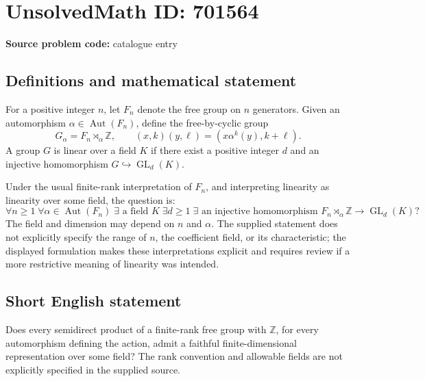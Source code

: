 \documentclass[11pt]{article}
\begin{document}
\section*{UnsolvedMath ID: 701564}
\textbf{Source problem code:} catalogue entry
\subsection{Definitions and mathematical statement}
For a positive integer \(n\), let \(F_n\) denote the free group on \(n\) generators. Given an automorphism \(\alpha\in\operatorname{Aut}(F_n)\), define the free-by-cyclic group
\[
G_\alpha=F_n\rtimes_\alpha\mathbb Z,
\qquad
(x,k)(y,\ell)=(x\alpha^k(y),k+\ell).
\]
A group \(G\) is linear over a field \(K\) if there exist a positive integer \(d\) and an injective homomorphism \(G\hookrightarrow\operatorname{GL}_d(K)\).

Under the usual finite-rank interpretation of \(F_n\), and interpreting linearity as linearity over some field, the question is:
\[
\forall n\geq 1\;\forall\alpha\in\operatorname{Aut}(F_n)\;
\exists\text{ a field }K\;\exists d\geq 1\;\exists\text{ an injective homomorphism }
F_n\rtimes_\alpha\mathbb Z\longrightarrow\operatorname{GL}_d(K)?
\]
The field and dimension may depend on \(n\) and \(\alpha\). The supplied statement does not explicitly specify the range of \(n\), the coefficient field, or its characteristic; the displayed formulation makes these interpretations explicit and requires review if a more restrictive meaning of linearity was intended.
\subsection{Short English statement}
Does every semidirect product of a finite-rank free group with \(\mathbb Z\), for every automorphism defining the action, admit a faithful finite-dimensional representation over some field? The rank convention and allowable fields are not explicitly specified in the supplied source.
\end{document}
